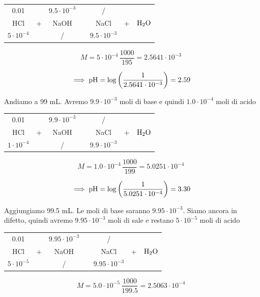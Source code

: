 \begin{center}
    \begin{tabular}{ccccccc}
        0.01 &  & $9.5 \cdot 10^{-3}$  & & / & &\\
        HCl & + & NaOH & \ce{->} & NaCl & + & $\rm H_2O$\\
        $5 \cdot 10^{-4}$ &  &  / & & $9.5 \cdot 10^{-3}$ & &\\
    \end{tabular}
\end{center}

$$M=5 \cdot 10^{-4} \, \frac{1000}{195}=2.5641 \cdot 10^{-3}$$

$$\implies \rm pH=\log \left( \frac{1}{2.5641 \cdot 10^{-3}} \right)=2.59$$

Andiamo a 99 mL. Avremo $9.9 \cdot 10^{-3}$ moli di base e quindi $1.0 \cdot 10^{-4}$ moli di acido

\begin{center}
    \begin{tabular}{ccccccc}
        0.01 &  & $9.9 \cdot 10^{-3}$  & & / & &\\
        HCl & + & NaOH & \ce{->} & NaCl & + & $\rm H_2O$\\
        $1 \cdot 10^{-4}$ &  &  / & & $9.9 \cdot 10^{-3}$ & &\\
    \end{tabular}
\end{center}

$$M=1.0 \cdot 10^{-4} \, \frac{1000}{199}=5.0251\cdot 10^{-4}$$

$$\implies \rm pH=\log \left( \frac{1}{5.0251\cdot 10^{-4}} \right)=3.30$$

Aggiungiamo 99.5 mL. Le moli di base saranno $9.95 \cdot 10^{-3}$. Siamo ancora in difetto, quindi avremo $9.95 \cdot 10^{-3}$ moli di sale e restano $5 \cdot 10^{-5}$ moli di acido

\begin{center}
    \begin{tabular}{ccccccc}
        0.01 &  & $9.95 \cdot 10^{-3}$  & & / & &\\
        HCl & + & NaOH & \ce{->} & NaCl & + & $\rm H_2O$\\
        $5 \cdot 10^{-5}$ &  &  / & & $9.95 \cdot 10^{-3}$ & &\\
    \end{tabular}
\end{center}

$$M=5.0 \cdot 10^{-5} \, \frac{1000}{199.5}=2.5063 \cdot 10^{-4}$$

